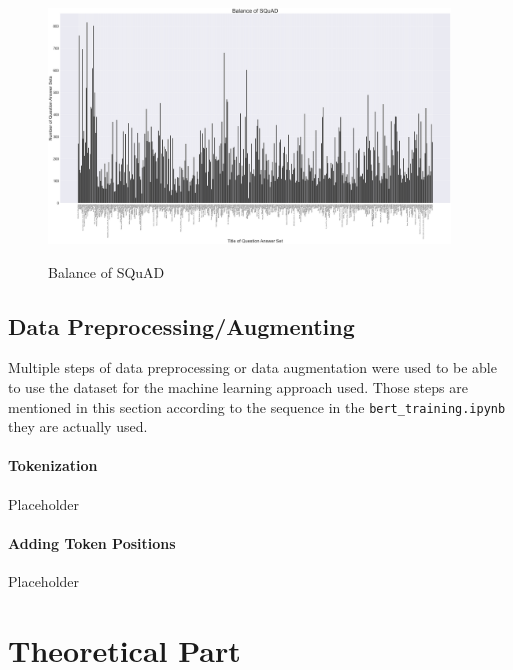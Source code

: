                 \begin{figure}[h!]
                    \centering
                    \caption{Balance of SQuAD}
                    \includegraphics[width=0.95\textwidth]{figures/balance_of_squad_dataset.png}
                    \label{fig:-data-properties---balance-of-data-barplot}
                \end{figure}


\pagebreak
        \subsection{Data Preprocessing/Augmenting}
        \label{subsec:-data-preprocessing-augmenting}

            Multiple steps of data preprocessing or data augmentation were used to be able to use the dataset for the machine learning approach used. 
            Those steps are mentioned in this section according to the sequence in the \texttt{bert\_training.ipynb} they are actually used.

            \paragraph{Tokenization}
            \label{par:-data-preprocessing-augmenting---tokenization}

                Placeholder


            \paragraph{Adding Token Positions}
            \label{par:-data-preprocessing-augmenting---adding-token-positions}

                Placeholder
            
    \section{Theoretical Part}
    \label{sec:theoretical-part}
            
